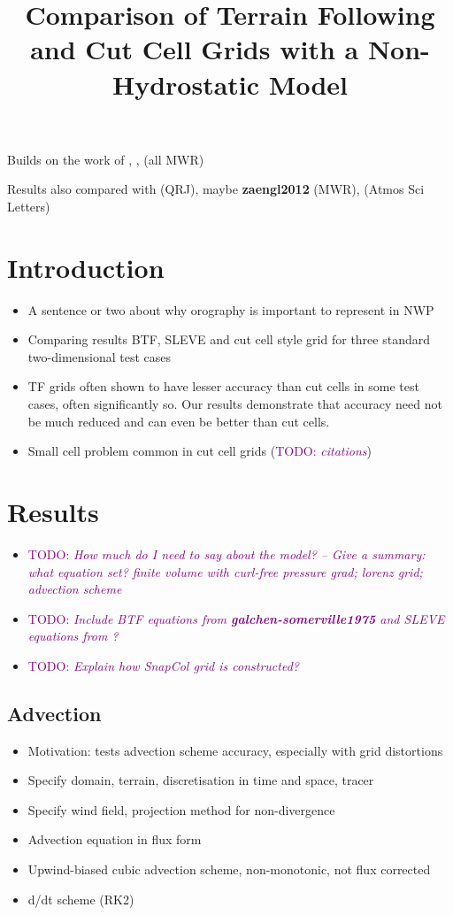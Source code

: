 \documentclass[twocol]{ametsoc}
\title{Comparison of Terrain Following and Cut Cell Grids with a Non-Hydrostatic Model}
\affiliation{}
\begin{document}
\newcommand{\TODO}[1]{\textcolor{purple}{TODO: \emph{#1}}}
\newcommand{\textcite}[1]{\textbf{#1}}

\maketitle

Builds on the work of \citet{schaer2002}, \citet{klemp2011}, \citet{weller-shahrokhi2014} (all MWR)

Results also compared with \citet{melvin2010} (QRJ), maybe \textcite{zaengl2012} (MWR), \citet{good2014} (Atmos Sci Letters)

\section{Introduction}

\begin{itemize}
	\item A sentence or two about why orography is important to represent in NWP
	\item Comparing results BTF, SLEVE and cut cell style grid for three standard two-dimensional test cases
	\item TF grids often shown to have lesser accuracy than cut cells in some test cases, often significantly so.  Our results demonstrate that accuracy need not be much reduced and can even be better than cut cells.
	\item Small cell problem common in cut cell grids (\TODO{citations})
\end{itemize}

\section{Results}
\begin{itemize}
	\item \TODO{How much do I need to say about the model?  -- Give a summary: what equation set? finite volume with curl-free pressure grad; lorenz grid; advection scheme}
	\item \TODO{Include BTF equations from \textcite{galchen-somerville1975} and SLEVE equations from \citet{schaer2002}?}
	\item \TODO{Explain how SnapCol grid is constructed?}
\end{itemize}

\subsection{Advection}
\begin{itemize}
	\item Motivation: tests advection scheme accuracy, especially with grid distortions
	\item Specify domain, terrain, discretisation in time and space, tracer
	\item Specify wind field, projection method for non-divergence
	\item Advection equation in flux form
	\item Upwind-biased cubic advection scheme, non-monotonic, not flux corrected
	\item d/dt scheme (RK2)
\end{itemize}
\end{document}
